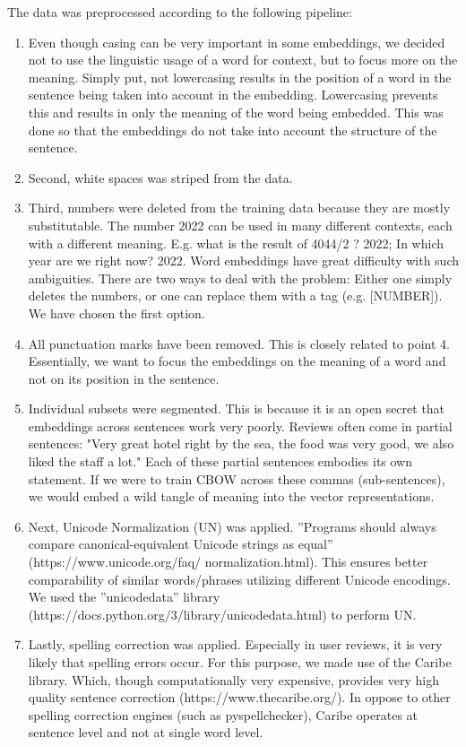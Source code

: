 \documentclass[fleqn,10pt]{SelfArx} %
\begin{document}
The data was preprocessed according to the following pipeline:
\begin{enumerate}[noitemsep]
    \item Even though casing can be very important in some embeddings, we decided not to use the linguistic usage of a word for context, but to focus more on the meaning. Simply put, not lowercasing results in the position of a word in the sentence being taken into account in the embedding. Lowercasing prevents this and results in only the meaning of the word being embedded. This was done so that the embeddings do not take into account the structure of the sentence.
    \item Second, white spaces was striped from the data. 
    \item Third, numbers were deleted from the training data because they are mostly substitutable. The number 2022 can be used in many different contexts, each with a different meaning. E.g. what is the result of 4044/2 ? 2022; In which year are we right now? 2022. Word embeddings have great difficulty with such ambiguities. There are two ways to deal with the problem: Either one simply deletes the numbers, or one can replace them with a tag (e.g. [NUMBER]). We have chosen the first option.
    \item All punctuation marks have been removed. This is closely related to point 4. Essentially, we want to focus the embeddings on the meaning of a word and not on its position in the sentence.
    \item Individual subsets were segmented. This is because it is an open secret that embeddings across sentences work very poorly. Reviews often come in partial sentences: "Very great hotel right by the sea, the food was very good, we also liked the staff a lot." Each of these partial sentences embodies its own statement. If we were to train CBOW across these commas (sub-sentences), we would embed a wild tangle of meaning into the vector representations.
    \item Next, Unicode Normalization (UN) was applied. ”Programs should always compare canonical-equivalent Unicode strings as equal” (https://www.unicode.org/faq/
    normalization.html). This ensures better comparability of similar words/phrases utilizing different Unicode encodings. We used the ”unicodedata” library (https://docs.python.org/3/library/unicodedata.html) to perform UN.
    \item Lastly, spelling correction was applied. Especially in user reviews, it is very likely that spelling errors occur. For this purpose, we made use of the Caribe library. Which, though computationally very expensive, provides very high quality sentence correction (https://www.thecaribe.org/). In oppose to other spelling correction engines (such as pyspellchecker), Caribe operates at sentence level and not at single word level.
\end{enumerate}
\end{document}
